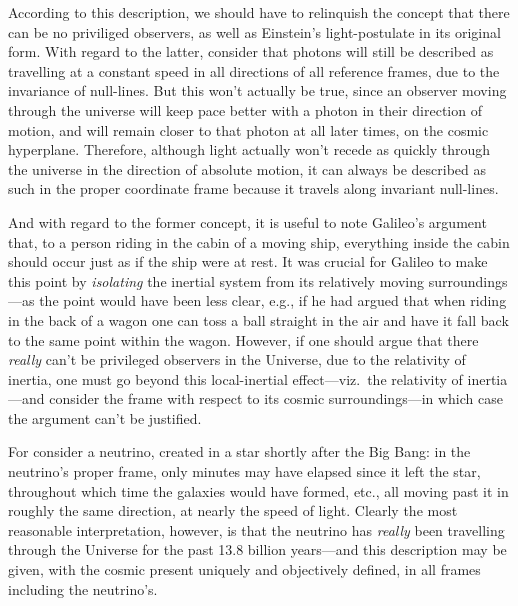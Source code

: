 \documentclass[11pt]{article}
\begin{document}
According to this description, we should have to relinquish the concept that there can be no priviliged observers, as well as Einstein's light-postulate in its original form. With regard to the latter, consider that photons will still be described as travelling at a constant speed in all directions of all reference frames, due to the invariance of null-lines. But this won't actually be true, since an observer moving through the universe will keep pace better with a photon in their direction of motion, and will remain closer to that photon at all later times, on the cosmic hyperplane. Therefore, although light actually won't recede as quickly through the universe in the direction of absolute motion, it can always be described as such in the proper coordinate frame because it travels along invariant null-lines.

And with regard to the former concept, it is useful to note Galileo's argument that, to a person riding in the cabin of a moving ship, everything inside the cabin should occur just as if the ship were at rest. It was crucial for Galileo to make this point by \textit{isolating} the inertial system from its relatively moving surroundings---as the point would have been less clear, e.g., if he had argued that when riding in the back of a wagon one can toss a ball straight in the air and have it fall back to the same point within the wagon. However, if one should argue that there \textit{really} can't be privileged observers in the Universe, due to the relativity of inertia, one must go beyond this local-inertial effect---viz.\ the relativity of inertia---and consider the frame with respect to its cosmic surroundings---in which case the argument can't be justified. 

For consider a neutrino, created in a star shortly after the Big Bang: in the neutrino's proper frame, only minutes may have elapsed since it left the star, throughout which time the galaxies would have formed, etc., all moving past it in roughly the same direction, at nearly the speed of light. Clearly the most reasonable interpretation, however, is that the neutrino has \textit{really} been travelling through the Universe for the past 13.8 billion years---and this description may be given, with the cosmic present uniquely and objectively defined, in all frames including the neutrino's. %
\end{document}
